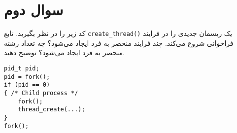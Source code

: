 \section{سوال دوم}

کد زیر را در نظر بگیرید. تابع \texttt{create\_thread()} یک ریسمان جدیدی را در فرایند فراخوانی شروع می‌کند. چند فرایند منحصر به فرد ایجاد می‌شود؟ چه تعداد رشته منحصر به فرد ایجاد می‌شود؟ توضیح دهید.


\begin{latin}
\begin{lstlisting}[caption=Code of Q2, label=cpp_code_example]
pid_t pid;
pid = fork();
if (pid == 0) 
{ /* Child process */
	fork();
	thread_create(...);
}
fork();

\end{lstlisting}
\end{latin}


\begin{qsolve}
	
\end{qsolve}
